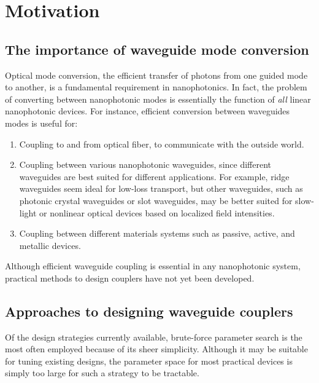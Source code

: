 \documentclass[letterpaper,10pt]{article}
\begin{document}
\section{Motivation}

\subsection{The importance of waveguide mode conversion}
Optical mode conversion, 
    the efficient transfer of photons from one guided mode to another,
    is a fundamental requirement in nanophotonics.
In fact, the problem of converting between nanophotonic modes is essentially
    the function of \emph{all} linear nanophotonic devices.
For instance, efficient conversion between waveguides modes
    is useful for:
    \begin{enumerate}
        \item Coupling to and from optical fiber\cite{fibergrating}, 
        to communicate with the outside world.
    \item Coupling between various nanophotonic waveguides, 
        since different waveguides are best suited for different applications.
        For example, ridge waveguides seem ideal for 
            low-loss transport\cite{ridge},
            but other waveguides, 
            such as photonic crystal waveguides or slot waveguides,
            may be better suited for slow-light\cite{pcslow} 
            or nonlinear optical devices based on 
            localized field intensities\cite{slotfocus}.
    \item Coupling between different materials systems such as
       passive, active\cite{active}, and metallic\cite{metallic} devices. 
    \end{enumerate}
Although efficient waveguide coupling is essential in any nanophotonic system,
    practical methods to design couplers have not yet been developed.

\subsection{Approaches to designing waveguide couplers}
Of the design strategies currently available,
    brute-force parameter search is the most often employed 
    because of its sheer simplicity.
Although it may be suitable for tuning existing designs,
    the parameter space for most practical devices is simply too large
    for such a strategy to be tractable.
\end{document}
